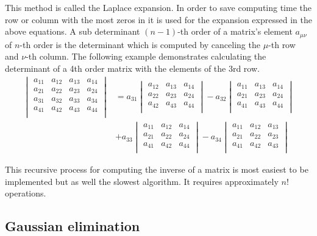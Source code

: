 This method is called the Laplace expansion.  In order to save
computing time the row or column with the most zeros in it is used for
the expansion expressed in the above equations.  A sub determinant
$(n-1)$-th order of a matrix's element $a_{\mu\nu}$ of $n$-th order is
the determinant which is computed by canceling the $\mu$-th row and
$\nu$-th column.  The following example demonstrates calculating the
determinant of a 4th order matrix with the elements of the 3rd row.
\begin{align}
\begin{vmatrix}
a_{11} & a_{12} & a_{13} & a_{14}\\
a_{21} & a_{22} & a_{23} & a_{24}\\
a_{31} & a_{32} & a_{33} & a_{34}\\
a_{41} & a_{42} & a_{43} & a_{44}\\
\end{vmatrix}
&= a_{31}
\begin{vmatrix}
a_{12} & a_{13} & a_{14}\\
a_{22} & a_{23} & a_{24}\\
a_{42} & a_{43} & a_{44}\\
\end{vmatrix}
- a_{32}
\begin{vmatrix}
a_{11} & a_{13} & a_{14}\\
a_{21} & a_{23} & a_{24}\\
a_{41} & a_{43} & a_{44}\\
\end{vmatrix}\\
\nonumber
&+ a_{33}
\begin{vmatrix}
a_{11} & a_{12} & a_{14}\\
a_{21} & a_{22} & a_{24}\\
a_{41} & a_{42} & a_{44}\\
\end{vmatrix}
- a_{34}
\begin{vmatrix}
a_{11} & a_{12} & a_{13}\\
a_{21} & a_{22} & a_{23}\\
a_{41} & a_{42} & a_{43}\\
\end{vmatrix}
\end{align}

This recursive process for computing the inverse of a matrix is most
easiest to be implemented but as well the slowest algorithm.  It
requires approximately $n!$ operations.

\subsection{Gaussian elimination}

